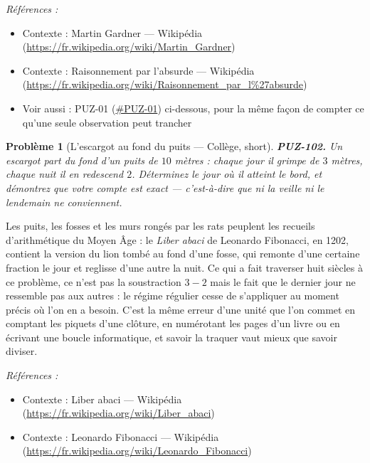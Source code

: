 \documentclass[11pt]{article}
\newtheorem{problem}{Problème}
\newenvironment{refs}{\par\small\noindent\emph{Références :}\begin{itemize}\setlength\itemsep{0pt}}{\end{itemize}\normalsize}
\begin{document}
\begin{refs}
\item Contexte : Martin Gardner --- Wikipédia (\url{https://fr.wikipedia.org/wiki/Martin_Gardner})
\item Contexte : Raisonnement par l'absurde --- Wikipédia (\url{https://fr.wikipedia.org/wiki/Raisonnement_par_l%27absurde})
\item Voir aussi : PUZ-01 (\url{#PUZ-01}) ci-dessous, pour la même façon de compter ce qu'une seule observation peut trancher
\end{refs}

\bigskip

\begin{problem}[{L'escargot au fond du puits --- Collège, short}]
\textbf{PUZ-102.} Un escargot part du fond d'un puits de $ 10 $ mètres :
chaque jour il grimpe de $ 3 $ mètres, chaque nuit il en redescend $ 2 $. Déterminez le
jour où il atteint le bord, et démontrez que votre compte est exact --- c'est-à-dire que ni la
veille ni le lendemain ne conviennent.
\end{problem}

\noindent Les puits, les fosses et les murs rongés par les rats peuplent les recueils
d'arithmétique du Moyen Âge : le \textit{Liber abaci} de Leonardo Fibonacci, en 1202, contient
la version du lion tombé au fond d'une fosse, qui remonte d'une certaine fraction le jour et
reglisse d'une autre la nuit. Ce qui a fait traverser huit siècles à ce problème, ce n'est pas
la soustraction $ 3 - 2 $ mais le fait que le dernier jour ne ressemble pas aux autres : le
régime régulier cesse de s'appliquer au moment précis où l'on en a besoin. C'est la même
erreur d'une unité que l'on commet en comptant les piquets d'une clôture, en numérotant les
pages d'un livre ou en écrivant une boucle informatique, et savoir la traquer vaut mieux que
savoir diviser.

\begin{refs}
\item Contexte : Liber abaci --- Wikipédia (\url{https://fr.wikipedia.org/wiki/Liber_abaci})
\item Contexte : Leonardo Fibonacci --- Wikipédia (\url{https://fr.wikipedia.org/wiki/Leonardo_Fibonacci})
\end{refs}

\bigskip
\end{document}
